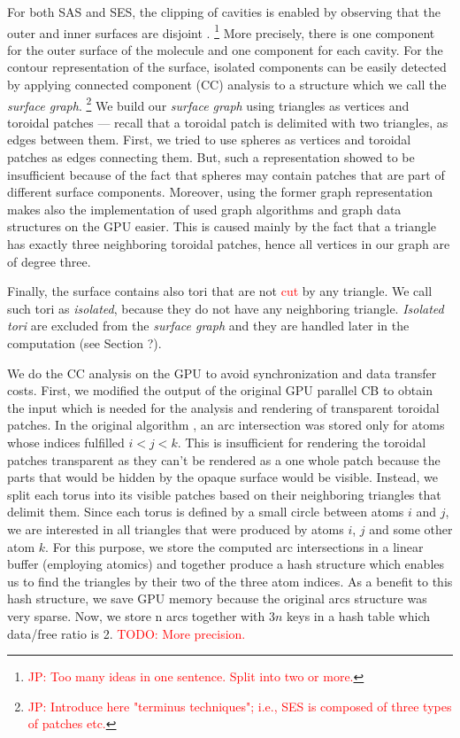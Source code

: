 For both SAS and SES, the clipping of cavities is enabled by observing that the outer and inner surfaces are disjoint \textcolor{red}{\cite{borland2011ambient}}.
\footnote{\textcolor{red}{JP: Too many ideas in one sentence. Split into two or more.}}
More precisely, there is one component for the outer surface of the molecule and one component for each cavity.
For the contour representation of the surface, isolated components can be easily detected by applying connected component (CC) analysis to a structure which we call the \textit{surface graph}.
\footnote{\textcolor{red}{JP: Introduce here "terminus techniques"; i.e., SES is composed of three types of patches etc.}}
We build our \textit{surface graph} using triangles as vertices and toroidal patches --- recall that a toroidal patch is delimited with two triangles, as edges between them.
First, we tried to use spheres as vertices and toroidal patches as edges connecting them. But, such a representation showed to be insufficient because of the fact that spheres may contain patches that are part of different surface components.
Moreover, using the former graph representation makes also the implementation of used graph algorithms and graph data structures on the GPU easier.
This is caused mainly by the fact that a triangle has exactly three neighboring toroidal patches, hence all vertices in our graph are of degree three.

Finally, the surface contains also tori that are not \textcolor{red}{cut} by any triangle.
We call such tori as \textit{isolated}, because they do not have any neighboring triangle.
\textit{Isolated tori} are excluded from the \textit{surface graph} and they are handled later in the computation (see Section ?).

We do the CC analysis on the GPU to avoid synchronization and data transfer costs.
First, we modified the output of the original GPU parallel CB to obtain the input which is needed for the analysis and rendering of transparent toroidal patches.
In the original algorithm \cite{krone2011parallel}, an arc intersection was stored only for atoms whose indices fulfilled $i < j < k$.
This is insufficient for rendering the toroidal patches transparent as they can't be rendered as a one whole patch because the parts that would be hidden by the opaque surface would be visible.
Instead, we split each torus into its visible patches based on their neighboring triangles that delimit them.
Since each torus is defined by a small circle between atoms $i$ and $j$, we are interested in all triangles that were produced by atoms $i$, $j$ and some other atom $k$.
For this purpose, we store the computed arc intersections in a linear buffer (employing atomics) and together produce a hash structure which enables us to find the triangles by their two of the three atom indices.
As a benefit to this hash structure, we save GPU memory because the original arcs structure was very sparse.
Now, we store n arcs together with $3 n$ keys in a hash table which data/free ratio is 2. \textcolor{red}{TODO: More precision.}


